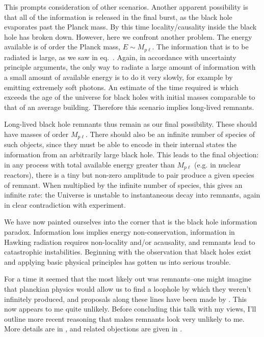This prompts consideration of other scenarios. Another apparent
possibility is that all of the information is released in the final
burst, as the black hole evaporates past the Planck mass. By this time
locality/causality inside the black hole has broken down. However, here
we confront another problem. The energy available is of order the Planck
mass, ${E} {\sim} {M_{p\ell}}$. The information that is to be radiated
is large, as we saw in eq.~\infoloss. Again, in accordance with
uncertainty principle arguments, the only way to radiate a large amount
of information with a small amount of available energy is to do it very
slowly, for example by emitting extremely soft photons. An estimate
 of the time required is
%
\eqn{}
%
which exceeds the age of the universe for black holes with initial
masses comparable to that of an average building. Therefore this
scenario implies long-lived remnants.

Long-lived black hole remnants thus remain as our final possibility.
These should have masses of order ${M_{p\ell}}$. There should
also be an infinite number of species of such objects, since they must
be able to encode in their internal states the information from an
arbitrarily large black hole. This leads to the final objection: in any
process with total available energy greater than ${M_{p\ell}}$ (e.g.
in nuclear reactors), there is a tiny but non-zero amplitude to
pair produce a given species of remnant. When multiplied by the infinite
number of species, this gives an infinite rate: the Universe is unstable
to instantaneous decay into remnants, again in clear contradiction with
experiment.

We have now painted ourselves into the corner that is the black hole
information paradox. Information loss implies energy non-conservation,
information in Hawking radiation requires non-locality and/or
acausality, and remnants lead to catastrophic instabilities. Beginning
with the observation that black holes exist and applying basic physical
principles has gotten us into serious trouble.

For a time it seemed that the most likely out was remnants--one might
imagine that planckian physics would allow us to find a loophole by
which they weren't infinitely produced, and proposals along these lines
have been made by . This now appears to me quite
unlikely. Before concluding this talk with my views, I'll outline more
recent
reasoning that makes remnants look very unlikely to me. More details are
in , and related objections are given in .

